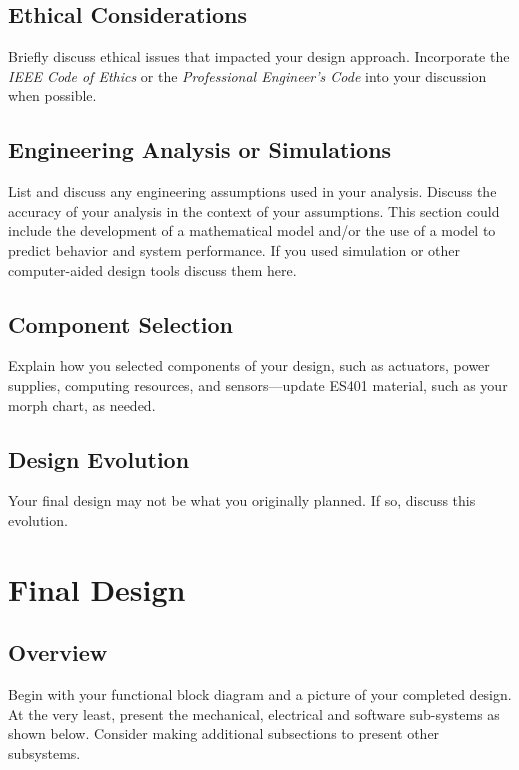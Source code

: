 \documentclass{wsecapstone}
\begin{document}
\subsection{Ethical Considerations}
Briefly discuss ethical issues that impacted your design approach.  Incorporate the \emph{IEEE Code of Ethics} or the \emph{Professional Engineer’s Code} into your discussion when possible. 

\subsection{Engineering Analysis or Simulations}
List and discuss any engineering assumptions used in your analysis.  Discuss the accuracy of your analysis in the context of your assumptions.
This section could include the development of a mathematical model and/or the use of a model to predict behavior and system performance.  If you used simulation or other computer-aided design tools discuss them here.
 
\subsection{Component Selection}
Explain how you selected components of your design, such as actuators, power supplies, computing resources, and sensors—update ES401 material, such as your morph chart, as needed.  

\subsection{Design Evolution}
Your final design may not be what you originally planned. If so, discuss this evolution.





\section{Final Design}

\subsection{Overview}
Begin with your functional block diagram and a picture of your completed design.   At the very least, present the mechanical, electrical and software sub-systems as shown below.  Consider making additional subsections to present other subsystems.   
\end{document}
